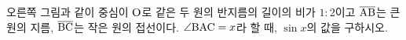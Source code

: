 \noindent\begin{minipage}[t]{0.58\linewidth}\vspace{0pt}\raggedright 오른쪽 그림과 같이 중심이 $\mathrm{O}$로 같은 두 원의 반지름의 길이의 비가 $1:2$이고 $\overline{\mathrm{AB}}$는 큰 원의 지름, $\overline{\mathrm{BC}}$는 작은 원의 접선이다. $\angle\mathrm{BAC}=x$라 할 때, $\sin x$의 값을 구하시오.\end{minipage}\hfill\begin{minipage}[t]{0.4\linewidth}\vspace{0pt}\centering \resizebox{\ifdim\width>\linewidth\linewidth\else\width\fi}{!}{}\end{minipage}\par
